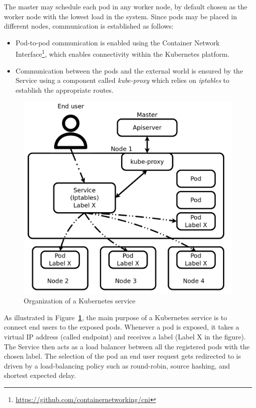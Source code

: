 \documentclass[letterpaper,twocolumn,10pt]{article}
\let\origref\ref
\def\ref#1{\textbf{\origref{#1}}}
\begin{document}
The master may schedule each pod in any worker node, by default chosen
as the worker node with the lowest load in the system. Since pods may
be placed in different nodes, communication is established as follows:

\begin{itemize}
\item Pod-to-pod communication is enabled using the Container Network
  Interface\footnote{\url{https://github.com/containernetworking/cni}},
  which enables connectivity within the Kubernetes platform.
\item Communication between the pods and the external world is ensured
  by the Service using a component called \emph{kube-proxy} which
  relies on \emph{iptables} to establish the appropriate routes.
\end{itemize}

\begin{figure}[t]
  \centering
  \includegraphics[width=.9\linewidth]{images/svc.png}
  \caption{Organization of a Kubernetes service}
  \label{fig:svc}
\end{figure}

As illustrated in Figure~\ref{fig:svc}, the main purpose of a
Kubernetes service is to connect end users to the exposed
pods. Whenever a pod is exposed, it takes a virtual IP address (called
endpoint) and receives a label (Label X in the figure). The Service
then acts as a load balancer between all the registered pods with the
chosen label. The selection of the pod an end user request gets
redirected to is driven by a load-balancing policy such as
round-robin, source hashing, and shortest expected delay.
\end{document}
